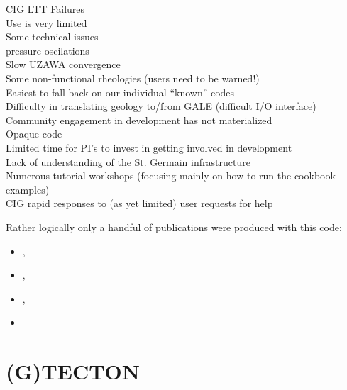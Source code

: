 \hspace{1cm}
\begin{minipage}[t]{0.75\textwidth}
CIG LTT Failures\\
Use is very limited\\
Some technical issues\\
pressure oscilations\\
Slow UZAWA convergence\\
Some non-functional rheologies (users need to be warned!)\\
Easiest to fall back on our individual ``known'' codes\\
Difficulty in translating geology to/from GALE (difficult I/O interface)\\
Community engagement in development has not materialized \\
Opaque code\\
Limited time for PI's to invest in getting involved in development\\
Lack of understanding of the St. Germain infrastructure\\
Numerous tutorial workshops (focusing mainly on how to run the cookbook examples)\\
CIG rapid responses to (as yet limited) user requests for help
\end{minipage}

Rather logically only a handful of publications were produced with this code:

\begin{small}
\begin{itemize}
\item[\twothousandeight]     \textcite{fabs08},  \textcite{gotc08}
\item[\twothousandten]       \textcite{beve10},  \textcite{crmw10}
\item[\twothousandtwelve]    \textcite{lehm12},  \textcite{liqi12}
\item[\twothousandthirteen]  \textcite{arbi13}
\end{itemize}
\end{small}


\section{(G)TECTON} 

